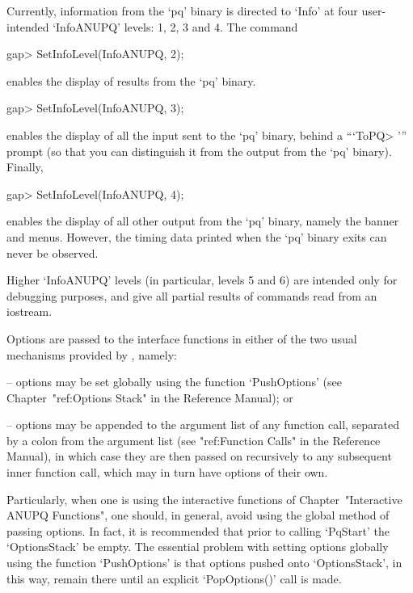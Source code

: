 Currently, information from the `pq' binary is directed to `Info' at four
user-intended `InfoANUPQ' levels: 1, 2, 3 and 4. The command

\beginexample
gap> SetInfoLevel(InfoANUPQ, 2);
\endexample

enables the display of results from the `pq'  binary.

\beginexample
gap> SetInfoLevel(InfoANUPQ, 3);
\endexample

enables the display of all the input sent to the `pq'  binary,  behind  a
```ToPQ> ''' prompt (so that you can distinguish it from the output  from
the `pq' binary). Finally,

\beginexample
gap> SetInfoLevel(InfoANUPQ, 4);
\endexample

enables the display of all other output from the `pq' binary, namely  the
banner and menus. However, the timing data printed when the  `pq'  binary
exits can never be observed.

Higher `InfoANUPQ' levels (in particular, levels 5 and  6)  are  intended
only for debugging purposes, and give all  partial  results  of  commands
read from an iostream.


Options are passed to the {\ANUPQ} interface functions in either  of  the
two usual mechanisms provided by {\GAP}, namely:

\beginlist

\item{--} options may be set globally using  the  function  `PushOptions'
(see Chapter~"ref:Options Stack" in the {\GAP} Reference Manual); or

\item{--} options may be appended to the argument list  of  any  function
call, separated by a colon from  the  argument  list  (see  "ref:Function
Calls" in the {\GAP} Reference Manual),  in  which  case  they  are  then
passed on recursively to any subsequent inner function call, which may in
turn have options of their own.

\endlist

Particularly,  when  one  is   using   the   interactive   functions   of
Chapter~"Interactive ANUPQ Functions",  one  should,  in  general,  avoid
using the global method of passing options. In fact,  it  is  recommended
that  prior  to  calling  `PqStart'  the  `OptionsStack'  be  empty.  The
essential problem  with  setting  options  globally  using  the  function
`PushOptions' is that options pushed onto `OptionsStack',  in  this  way,
remain there until an explicit `PopOptions()' call is made.

